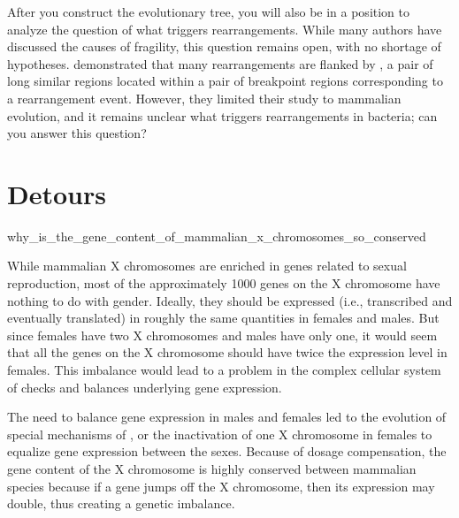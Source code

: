 After you construct the evolutionary tree, you will also be in a position to analyze the question of what triggers rearrangements. While many authors have discussed the causes of fragility, this question remains open, with no shortage of hypotheses. \cite{zhao_bourque_2009} demonstrated that many rearrangements are flanked by , a pair of long similar regions located within a pair of breakpoint regions corresponding to a rearrangement event. However, they limited their study to mammalian evolution, and it remains unclear what triggers rearrangements in bacteria; can you answer this question?\\

\FloatBarrier
\section{Detours}
\label{sec:detours_rearrangements}

\begin{detour}{why_is_the_gene_content_of_mammalian_x_chromosomes_so_conserved}

While mammalian X chromosomes are enriched in genes related to sexual reproduction, most of the approximately 1000 genes on the X chromosome have nothing to do with gender. Ideally, they should be expressed (i.e., transcribed and eventually translated) in roughly the same quantities in females and males.  But since females have two X chromosomes and males have only one, it would seem that all the genes on the X chromosome should have twice the expression level in females.  This imbalance would lead to a problem in the complex cellular system of checks and balances underlying gene expression.

The need to balance gene expression in males and females led to the evolution of special mechanisms of , or the inactivation of one X chromosome in females to equalize gene expression between the sexes. Because of dosage compensation, the gene content of the X chromosome is highly conserved between mammalian species because if a gene jumps off the X chromosome, then its expression may double, thus creating a genetic imbalance.
\end{detour}

